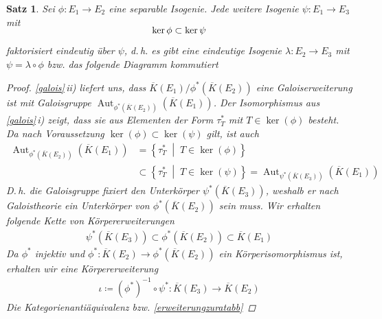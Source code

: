 \documentclass[english, german, parskip=half]{scrartcl}
\newtheorem{Satz}{Satz}[section]
\theoremstyle{definition}
\theoremstyle{remark}
\newcommand*{\algK}{\ensuremath{\overline K}} %
\newcommand*{\longto}{\longrightarrow}
\DeclareMathOperator{\Aut}{Aut} %
\begin{document}
\begin{Satz}\label{homomorphiesatz}
  Sei $\phi\colon E_1\to E_2$ eine separable Isogenie.
  Jede weitere Isogenie $\psi\colon E_1\to E_3$ mit
  \begin{gather*}
    \SwapAboveDisplaySkip
    \ker\phi \subset \ker\psi
  \end{gather*}
  faktorisiert eindeutig über $\psi$, d.\,h. es gibt eine eindeutige
  Isogenie $\lambda\colon E_2\to E_3$ mit
  $\psi = \lambda\circ\phi$
  bzw. das folgende Diagramm kommutiert
  \begin{center}
  \end{center}
  \begin{proof}
    \autoref{galois}\,ii) liefert uns, dass
    $\algK(E_1)/\phi^*(\algK(E_2))$ eine Galoiserweiterung ist mit
    Galoisgruppe $\Aut_{\phi^*(\algK(E_2))}(\algK(E_1))$.
    Der Isomorphismus aus \autoref{galois}\,i) zeigt, dass sie aus
    Elementen der Form $\tau_T^*$ mit $T\in\ker(\phi)$ besteht.
    Da nach Voraussetzung $\ker(\phi)\subset\ker(\psi)$ gilt,
    ist auch
    \begin{align*}
      \Aut_{\phi^*(\algK(E_2))}(\algK(E_1))
      &= \left\{ \tau_T^* \;\middle|\; T\in\ker(\phi) \right\} \\
      &\subset
        \left\{ \tau_T^* \;\middle|\; T\in\ker(\psi) \right\}
        = \Aut_{\psi^*(\algK(E_3))}(\algK(E_1))
    \end{align*}
    D.\,h. die Galoisgruppe fixiert den Unterkörper
    $\psi^*(\algK(E_3))$, weshalb er nach Galoistheorie ein
    Unterkörper von $\phi^*(\algK(E_2))$ sein muss.
    Wir erhalten folgende Kette von Körpererweiterungen
    \begin{gather*}
      \psi^*(\algK(E_3)) 
      \subset \phi^*(\algK(E_2)) 
      \subset \algK(E_1)
    \end{gather*}
    Da $\phi^*$ injektiv und 
    $\phi^*\colon\algK(E_2)\to\phi^*(\algK(E_2))$ ein
    Körperisomorphismus ist, erhalten wir eine Körpererweiterung
    \begin{gather*}
      \iota\coloneqq 
      (\phi^*)^{-1} \circ \psi^*
      \colon \algK(E_3) \longto \algK(E_2)
    \end{gather*}
    Die Kategorienantiäquivalenz bzw. \autoref{erweiterungzuratabb}

\end{proof}
\end{Satz}
\end{document}
